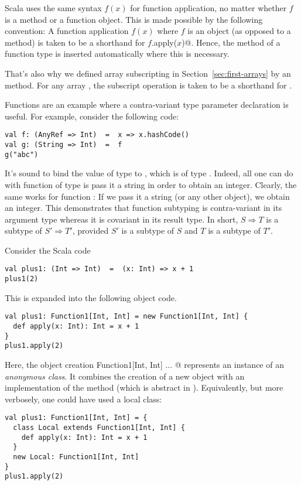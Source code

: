Scala uses the same syntax $f(x)$ for function application, no matter
whether $f$ is a method or a function object. This is made possible by
the following convention: A function application $f(x)$ where $f$ is
an object (as opposed to a method) is taken to be a shorthand for
\lstinline@$f$.apply($x$)@. Hence, the  method of a
function type is inserted automatically where this is necessary.

That's also why we defined array subscripting in
Section~\ref{sec:first-arrays} by an  method.  For any
array , the subscript operation  is taken to be a
shorthand for .

Functions are an example where a contra-variant type parameter
declaration is useful. For example, consider the following code:
\begin{lstlisting}
val f: (AnyRef => Int)  =  x => x.hashCode()
val g: (String => Int)  =  f
g("abc")
\end{lstlisting}
It's sound to bind the value  of type  to
, which is of type . Indeed, all one can
do with function of type  is pass it a string in
order to obtain an integer. Clearly, the same works for function
: If we pass it a string (or any other object), we obtain an
integer.  This demonstrates that function subtyping is contra-variant
in its argument type whereas it is covariant in its result type.
In short, $S \Rightarrow T$ is a subtype of $S' \Rightarrow T'$, provided
$S'$ is a subtype of $S$ and $T$ is a subtype of $T'$.

\example Consider the Scala code
\begin{lstlisting}
val plus1: (Int => Int)  =  (x: Int) => x + 1
plus1(2)
\end{lstlisting}
This is expanded into the following object code.
\begin{lstlisting}
val plus1: Function1[Int, Int] = new Function1[Int, Int] {
  def apply(x: Int): Int = x + 1
}
plus1.apply(2)
\end{lstlisting}
Here, the object creation \lstinline@new Function1[Int, Int]{ ... }@
represents an instance of an {\em anonymous class}. It combines the
creation of a new  object with an implementation of 
the  method (which is abstract in ).
Equivalently, but more verbosely, one could have used a local class:
\begin{lstlisting}
val plus1: Function1[Int, Int] = {
  class Local extends Function1[Int, Int] {
    def apply(x: Int): Int = x + 1
  }
  new Local: Function1[Int, Int]
}
plus1.apply(2)
\end{lstlisting}

